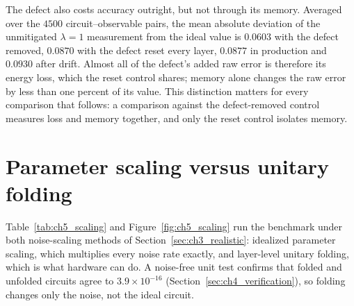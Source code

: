\documentclass[Thesis.tex]{subfiles}
\begin{document}
The defect also costs accuracy outright, but not through its memory. Averaged over
the $4500$ circuit--observable pairs, the mean absolute deviation of the unmitigated
$\lambda = 1$ measurement from the ideal value is $0.0603$ with the defect removed,
$0.0870$ with the defect reset every layer, $0.0877$ in production and $0.0930$
after drift. Almost all of the defect's added raw error is therefore its
energy loss, which the reset control shares; memory alone changes the raw error by
less than one percent of its value. This distinction matters for every comparison
that follows: a comparison against the defect-removed control measures loss and
memory together, and only the reset control isolates memory.

\section{Parameter scaling versus unitary folding}\label{sec:ch5_scaling}

Table~\ref{tab:ch5_scaling} and Figure~\ref{fig:ch5_scaling} run the benchmark under
both noise-scaling methods of Section~\ref{sec:ch3_realistic}: idealized parameter
scaling, which multiplies every noise rate exactly, and layer-level unitary folding,
which is what hardware can do. A noise-free unit test confirms that folded and
unfolded circuits agree to $3.9 \times 10^{-16}$ (Section~\ref{sec:ch4_verification}),
so folding changes only the noise, not the ideal circuit.
\end{document}
